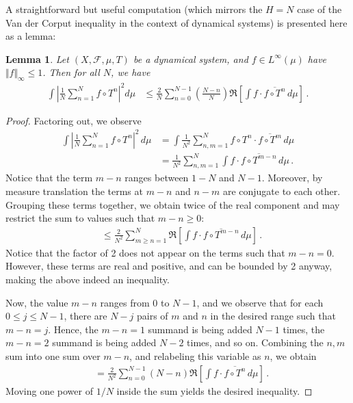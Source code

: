 \documentclass[11pt, oneside]{amsart}   	%
\newcommand{\1}{\mathbbm{1}}
\newcommand{\norm}[1]{\left\lVert#1\right\rVert}
\newtheorem{lemma}[theorem]{Lemma}
\theoremstyle{definition}
\begin{document}
A straightforward but useful computation (which mirrors the $H = N$ case of the Van der Corput inequality in the context of dynamical systems) is presented here as a lemma:
\begin{lemma}\label{L:vdc for systems}
Let $(X, \mathcal{F}, \mu, T)$ be a dynamical system, and $f\in L^\infty(\mu)$ have $\Vert f\Vert_{\infty} \leq 1$. Then for all $N$, we have
\begin{align*}
\int \left| \frac{1}{N} \sum_{n=1}^N f\circ T^{n} \right|^2 d\mu &\leq \frac{2}{N} \sum_{n = 0}^{N-1} \left(\frac{N-n}{N}\right)\Re \left[\int f \cdot \overline{f\circ T^{n}} \, d\mu \right] \, .
\end{align*}
\end{lemma}

\begin{proof}
Factoring out, we observe
\begin{align*}
\int \left| \frac{1}{N} \sum_{n=1}^N f\circ T^{n} \right|^2 \, d\mu &=  \int  \frac{1}{N^2} \sum_{n, m=1}^N f\circ T^n \cdot \overline{f\circ T^m} \, d\mu \\
&=  \frac{1}{N^2} \sum_{n, m=1}^N \int f \cdot \overline{f\circ T^{m-n}} \, d\mu \, .
\end{align*}
Notice that the term $m-n$ ranges between $1-N$ and $N-1$. Moreover, by measure translation the terms at $m-n$ and $n-m$ are conjugate to each other. Grouping these terms together, we obtain twice of the real component and may restrict the sum to values such that $m - n \geq 0$:
\begin{align*}
&\leq  \frac{2}{N^2} \sum_{m \geq n = 1}^N  \Re \left[\int f\cdot \overline{f\circ T^{m-n}} \, d\mu \right]\, .
\end{align*}
Notice that the factor of 2 does not appear on the terms such that $m-n =0$. However, these terms are real and positive, and can be bounded by 2 anyway, making the above indeed an inequality.

Now, the value $m-n$ ranges from $0$ to $N-1$, and we observe that for each $0 \leq j \leq N-1$, there are $N-j$ pairs of $m$ and $n$ in the desired range such that $m-n = j$. Hence, the $m-n = 1$ summand is being added $N-1$ times, the $m-n = 2$ summand is being added $N-2$ times, and so on. Combining the $n, m$ sum into one sum over $m-n$, and relabeling this variable as $n$, we obtain
\begin{align*}
&=  \frac{2}{N^2} \sum_{n = 0}^{N-1} \left(N-n\right)\Re \left[\int f \cdot \overline{f\circ T^{n}} \, d\mu \right] \, .
\end{align*}
Moving one power of $1/N$ inside the sum yields the desired inequality.
\end{proof}
\end{document}
